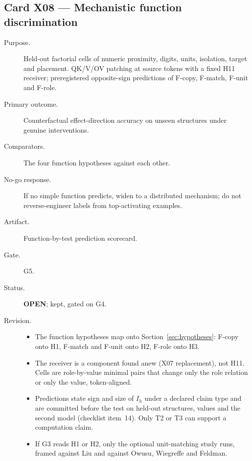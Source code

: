 \documentclass[10pt,a4paper]{article}
\begin{document}
\subsection{Card X08 --- Mechanistic function discrimination}
\label{card:X08}
\begin{description}
\item[Purpose.] Held-out factorial cells of numeric proximity, digits, units, isolation, target and placement.
QK/V/OV patching at source tokens with a fixed H11 receiver; preregistered opposite-sign predictions of
F-copy, F-match, F-unit and F-role.
\item[Primary outcome.] Counterfactual effect-direction accuracy on unseen structures under genuine
interventions.
\item[Comparators.] The four function hypotheses against each other.
\item[No-go response.] If no simple function predicts, widen to a distributed mechanism; do not reverse-engineer
labels from top-activating examples.
\item[Artifact.] Function-by-test prediction scorecard.
\item[Gate.] G5.
\item[Status.] \textbf{OPEN}; kept, gated on G4.
\item[Revision.]
\begin{itemize}
\item The function hypotheses map onto Section~\ref{sec:hypotheses}: F-copy onto H1, F-match and F-unit onto H2,
F-role onto H3.
\item The receiver is a component found anew (X07 replacement), not H11. Cells are role-by-value minimal pairs that
change only the role relation or only the value, token-aligned.
\item Predictions state sign and size of $I_h$ under a declared claim type and are committed before the test on
held-out structures, values and the second model (checklist item~14). Only T2 or T3 can support a computation
claim.
\item If G3 reads H1 or H2, only the optional unit-matching study runs, framed against Liu and against Owusu,
Wiegreffe and Feldman.
\end{itemize}
\end{description}

\end{document}
